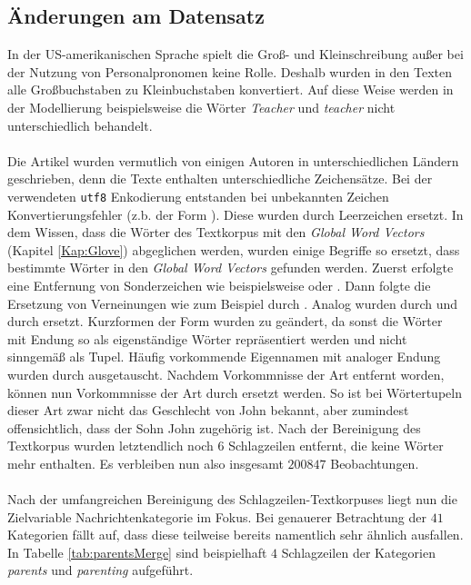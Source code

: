 \documentclass[a4paper,11pt]{article}
\begin{document}
\subsection{Änderungen am Datensatz} \label{kap:2_2Aend}

In der US-amerikanischen Sprache spielt die Groß- und Kleinschreibung außer bei der Nutzung von Personalpronomen keine Rolle. Deshalb wurden in den Texten alle Großbuchstaben zu Kleinbuchstaben konvertiert. Auf diese Weise werden in der Modellierung beispielsweise die Wörter \textit{Teacher} und \textit{teacher} nicht unterschiedlich behandelt. \\
\\
Die Artikel wurden vermutlich von einigen Autoren in unterschiedlichen Ländern geschrieben, denn die Texte enthalten unterschiedliche Zeichensätze. Bei der verwendeten \texttt{utf8} Enkodierung entstanden bei unbekannten Zeichen Konvertierungsfehler (z.b. der Form ). Diese wurden durch Leerzeichen ersetzt. In dem Wissen, dass die Wörter des Textkorpus mit den \textit{Global Word Vectors} (Kapitel \ref{Kap:Glove}) abgeglichen werden, wurden einige Begriffe so ersetzt, dass bestimmte Wörter in den \textit{Global Word Vectors} gefunden werden. Zuerst erfolgte eine Entfernung von Sonderzeichen wie beispielsweise  oder . Dann folgte die Ersetzung von Verneinungen wie zum Beispiel  durch . Analog wurden  durch  und  durch  ersetzt. Kurzformen der Form  wurden zu  geändert, da sonst die Wörter mit Endung  so als eigenständige Wörter repräsentiert werden und nicht sinngemäß als Tupel. Häufig vorkommende Eigennamen mit analoger Endung  wurden durch  ausgetauscht. Nachdem Vorkommnisse der Art  entfernt worden, können nun Vorkommnisse der Art  durch  ersetzt werden. So ist bei Wörtertupeln dieser Art zwar nicht das Geschlecht von John bekannt, aber zumindest offensichtlich, dass der Sohn John zugehörig ist. Nach der Bereinigung des Textkorpus wurden letztendlich noch $6$ Schlagzeilen entfernt, die keine Wörter mehr enthalten. Es verbleiben nun also insgesamt $200847$ Beobachtungen.\\
\\
Nach der umfangreichen Bereinigung des Schlagzeilen-Textkorpuses liegt nun die Zielvariable Nachrichtenkategorie im Fokus.
Bei genauerer Betrachtung der $41$ Kategorien fällt auf, dass diese teilweise bereits namentlich sehr ähnlich ausfallen. In Tabelle \ref{tab:parentsMerge} sind beispielhaft $4$ Schlagzeilen der Kategorien \textit{parents} und \textit{parenting} aufgeführt.
\end{document}
